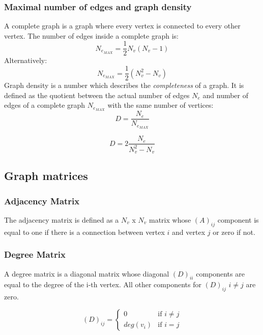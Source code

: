 \documentclass[a4paper,twoside, openright,12pt]{report}
\begin{document}
\subsubsection{Maximal number of edges and graph density}
A complete graph is a graph where every vertex is connected to every other vertex. 
The number of edges inside a complete graph is:
\begin{equation}
 N_{e_{MAX}} = \frac{1}{2} N_v \left( N_v - 1  \right)
\end{equation}  
Alternatively:
\begin{equation}
 N_{e_{MAX}} = \frac{1}{2} \left( {N_v^2 - N_v } \right)
\end{equation}  
Graph density is a number which describes the \textit{completeness} of a graph. It is defined as the
quotient between the actual number of edges $N_e$ and number of edges of a complete graph $N_{e_{MAX}}$ with the same number of vertices: 
\begin{equation}
 D = \frac{N_e}{N_{e_{MAX}}}
\end{equation} 

\begin{equation}
 D = 2\frac{N_e}{N_v^2 - N_v}
\end{equation} 

\subsection{Graph matrices}
\subsubsection{Adjacency Matrix}
The adjacency matrix is defined as a $N_v$ x $N_v$ matrix whose $(A)_{ij}$ component is equal to one if there is a connection between vertex $i$ and vertex $j$ or zero if not.

\subsubsection{Degree Matrix}
A degree matrix is a diagonal matrix whose diagonal $(D)_{ii}$ components are equal to the degree of the i-th vertex.
All other components for $(D)_{ij}$ $i \ne j$ are zero.

\begin{equation}
  (D)_{ij} = \left\{ \begin{array}{ll}
0  & \mbox{if $i \ne j$} \\
 deg(v_i) & \mbox{if $i = j$}
                \end{array} \right. 
\end{equation}
\end{document}
